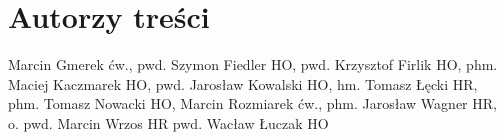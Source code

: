 \chapter{Autorzy treści}

Marcin Gmerek ćw., 
pwd. Szymon Fiedler HO, 
pwd. Krzysztof Firlik HO, 
phm. Maciej Kaczmarek HO, 
pwd. Jarosław Kowalski HO, 
hm. Tomasz Łęcki HR, 
phm. Tomasz Nowacki HO, 
Marcin Rozmiarek ćw., 
phm. Jarosław Wagner HR, 
o. pwd. Marcin Wrzos HR 
pwd. Wacław Łuczak HO